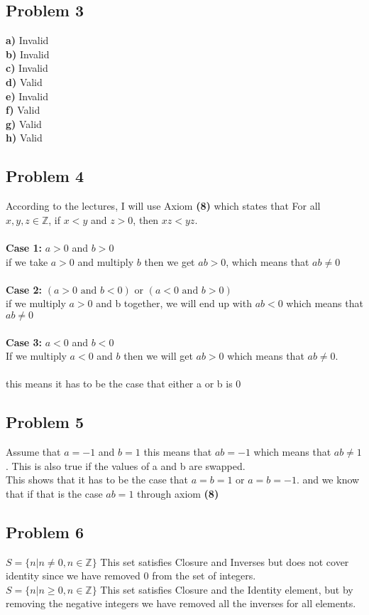 \documentclass[12pt]{article}
\newcommand{\Z}{\mathbb{Z}}
\begin{document}
\subsection*{Problem 3}
\textbf{a)} Invalid \\
\textbf{b)} Invalid \\
\textbf{c)} Invalid \\
\textbf{d)} Valid \\
\textbf{e)} Invalid \\
\textbf{f)} Valid \\
\textbf{g)} Valid \\
\textbf{h)} Valid \\
\newpage
\subsection*{Problem 4}
According to the lectures, I will use Axiom \textbf{(8)} which states that For all $x,y,z \in \Z$, if $x < y$ and $z>0$, then $xz < yz$.\\\\
\textbf{Case 1:} $a>0$ and $b>0$\\
if we take $a>0$ and multiply $b$ then we get $ab>0$, which means that $ab \neq 0$\\\\
\textbf{Case 2:} $(a>0 \text{ and } b<0)$ or $(a<0 \text{ and } b>0)$\\
if we multiply $a>0$ and b together, we will end up with $ab<0$ which means that $ab \neq 0$\\\\
\textbf{Case 3:} $a<0$ and $b<0$\\
If we multiply $a<0$ and $b$ then we will get $ab>0$ which means that $ab \neq 0$.\\\\
this means it has to be the case that either a or b is 0
\subsection*{Problem 5}
Assume that $a = -1$ and $b=1$ this means that $ab =-1$ which means that $ab \neq 1$. This is also true if the values of a and b are swapped.\\
This shows that it has to be the case that $a=b=1$ or $a=b=-1$. and we know that if that is the case $ab=1$ through axiom \textbf{(8)}
\subsection*{Problem 6}
$S = \{ n | n \neq 0, n \in \Z \}$ This set satisfies Closure and Inverses but does not cover identity since we have removed 0 from the set of integers.\\
$S = \{ n | n \geq 0, n \in \Z \}$ This set satisfies Closure and the Identity element, but by removing the negative integers we have removed all the inverses for all elements.
\end{document}
